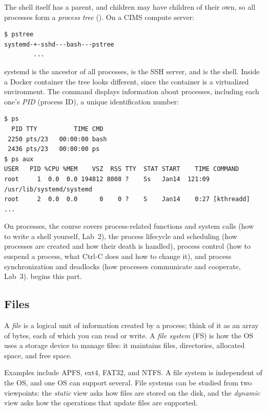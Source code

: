 The shell itself has a parent, and children may have children of their own, so all processes form a \emph{process tree} (). On a CIMS compute server:
\begin{lstlisting}[style=sh]
$ pstree
systemd-+-sshd---bash---pstree
        ...
\end{lstlisting}
systemd is the ancestor of all processes,  is the SSH server, and  is the shell. Inside a Docker container the tree looks different, since the container is a virtualized environment. The  command displays information about processes, including each one's \emph{PID} (process ID), a unique identification number:
\begin{lstlisting}[style=sh]
$ ps
  PID TTY          TIME CMD
 2250 pts/23   00:00:00 bash
 2436 pts/23   00:00:00 ps
$ ps aux
USER   PID %CPU %MEM    VSZ  RSS TTY  STAT START    TIME COMMAND
root     1  0.0  0.0 194812 8008 ?    Ss   Jan14  121:09 /usr/lib/systemd/systemd
root     2  0.0  0.0      0    0 ?    S    Jan14    0:27 [kthreadd]
...
\end{lstlisting}

On processes, the course covers process-related functions and system calls (how to write a shell yourself, Lab~2), the process lifecycle and scheduling (how processes are created and how their death is handled), process control (how to suspend a process, what Ctrl-C does and how to change it), and process synchronization and deadlocks (how processes communicate and cooperate, Lab~3).  begins this part.

\subsection{Files}

\begin{definition}
  A \emph{file} is a logical unit of information created by a process; think of it as an array of bytes, each of which you can read or write. A \emph{file system} (FS) is how the OS uses a storage device to manage files: it maintains files, directories, allocated space, and free space.
\end{definition}

Examples include APFS, ext4, FAT32, and NTFS. A file system is independent of the OS, and one OS can support several. File systems can be studied from two viewpoints: the \emph{static} view asks how files are stored on the disk, and the \emph{dynamic} view asks how the operations that update files are supported.

